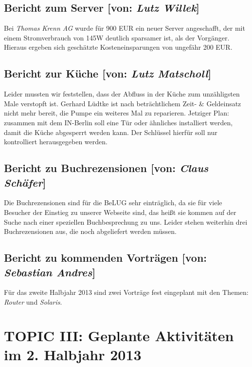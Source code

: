 \documentclass[11pt,a4paper,ngerman]{article}
\begin{document}
  \subsection{Bericht zum Server [von: 
\textcolor{hellgrau.60}{\textsl{Lutz Willek}}]}

Bei \textsl{Thomas Krenn AG} wurde für 900 EUR ein neuer Server angeschafft, 
der mit einem Stromverbrauch von 145W deutlich sparsamer ist, als der 
Vorgänger. Hieraus ergeben sich geschätzte Kosteneinsparungen von ungefähr 200 
EUR.


  \subsection{Bericht zur Küche [von: 
\textcolor{hellgrau.60}{\textsl{Lutz Matscholl}}]}

Leider mussten wir feststellen, dass der Abfluss in der Küche zum unzähligsten 
Male verstopft ist. Gerhard Lüdtke ist nach beträchtlichem Zeit- \& Geldeinsatz 
nicht mehr bereit, die Pumpe ein weiteres Mal zu reparieren. Jetziger Plan: 
zusammen mit dem IN-Berlin soll eine Tür oder ähnliches installiert werden, 
damit die Küche abgesperrt werden kann. Der Schlüssel hierfür soll nur 
kontrolliert herausgegeben werden.


  \subsection{Bericht zu Buchrezensionen [von: 
\textcolor{hellgrau.60}{\textsl{Claus Schäfer}}]}

Die Buchrezensionen sind für die BeLUG sehr einträglich, da sie für viele 
Besucher der Einstieg zu unserer Webseite sind, das heißt sie kommen auf der 
Suche nach einer speziellen Buchbesprechung zu uns. Leider stehen weiterhin 
drei Buchrezensionen aus, die noch abgeliefert werden müssen.


  \subsection{Bericht zu kommenden Vorträgen [von: 
\textcolor{hellgrau.60}{\textsl{Sebastian Andres}}]}

Für das zweite Halbjahr 2013 sind zwei Vorträge fest eingeplant mit den Themen: 
\textsl{Router} und \textsl{Solaris}.


\section{TOPIC III: Geplante Aktivitäten im 2. Halbjahr 2013}
\end{document}
